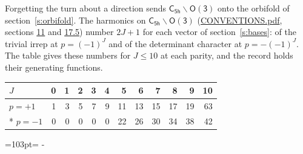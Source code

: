 \documentclass[10pt,a4paper]{article}
\newcommand{\needspace}[1]{\par\penalty-100\begingroup\dimen0=#1\relax\dimen2=\pagegoal
  \advance\dimen2-\pagetotal\ifdim\dimen0>\dimen2\relax\ifdim\dimen2>0pt\vfil\break\fi\fi
  \endgroup}
\numberwithin{equation}{section}
\newcommand{\grp}[1]{\mathsf{#1}}
\begin{document}
Forgetting the turn about a direction sends $\grp{C_{5h}}\backslash\grp{O(3)}$ onto the orbifold of section~\ref{s:orbifold}.
The harmonics on $\grp{C_{5h}}\backslash\grp{O(3)}$ (\href{../../CONVENTIONS.pdf}{CONVENTIONS.pdf}, sections \href{../../CONVENTIONS.pdf\#conv.11}{11} and \href{../../CONVENTIONS.pdf\#conv.17.5}{17.5}) number $2J + 1$ for each vector of section~\ref{s:bases}: of the trivial irrep at $p = (-1)^J$ and of the determinant character at $p = -(-1)^J$. The table gives these numbers for $J \le 10$ at each parity, and the record holds their generating functions.
{\small\setlength{\tabcolsep}{4pt}\begin{longtable}{@{}lrrrrrrrrrrr@{}}\toprule
$J$ & 0 & 1 & 2 & 3 & 4 & 5 & 6 & 7 & 8 & 9 & 10\\\midrule\endhead
\bottomrule\endfoot\endlastfoot
$p = +1$ & 1 & 3 & 5 & 7 & 9 & 11 & 13 & 15 & 17 & 19 & 63\\*
$p = -1$ & 0 & 0 & 0 & 0 & 0 & 22 & 26 & 30 & 34 & 38 & 42\\
\bottomrule\end{longtable}}
\needspace{103pt}
\end{document}
